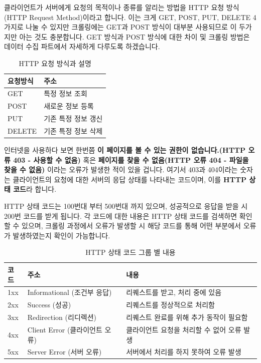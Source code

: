 \documentclass[]{book}
\begin{document}
클라이언트가 서버에게 요청의 목적이나 종류를 알리는 방법을 HTTP 요청 방식(HTTP Request Method)이라고 합니다. 이는 크게 GET, POST, PUT, DELETE 4가지로 나눌 수 있지만 크롤링에는 GET과 POST 방식이 대부분 사용되므로 이 두가지만 아는 것도 충분합니다. GET 방식과 POST 방식에 대한 차이 및 크롤링 방법은 데이터 수집 파트에서 자세하게 다루도록 하겠습니다.

\begin{table}[t]

\caption{\label{tab:unnamed-chunk-6}HTTP 요청 방식과 설명}
\centering
\begin{tabular}{ll}
\toprule
요청방식 & 주소\\
\midrule
GET & 특정 정보 조회\\
POST & 새로운 정보 등록\\
PUT & 기존 특정 정보 갱신\\
DELETE & 기존 특정 정보 삭제\\
\bottomrule
\end{tabular}
\end{table}

인터넷을 사용하다 보면 한번쯤 \textbf{이 페이지를 볼 수 있는 권한이 없습니다.(HTTP 오류 403 - 사용할 수 없음)} 혹은 \textbf{페이지를 찾을 수 없음(HTTP 오류 404 - 파일을 찾을 수 없음)} 이라는 오류가 발생한 적이 있을 겁니다. 여기서 403과 404이라는 숫자는 클라이언트의 요청에 대한 서버의 응답 상태를 나타내는 코드이며, 이를 \textbf{HTTP 상태 코드}라 합니다.

HTTP 상태 코드는 100번대 부터 500번대 까지 있으며, 성공적으로 응답을 받을 시 200번 코드를 받게 됩니다. 각 코드에 대한 내용은 HTTP 상태 코드를 검색하면 확인할 수 있으며, 크롤링 과정에서 오류가 발생할 시 해당 코드를 통해 어떤 부분에서 오류가 발생하였는지 확인이 가능합니다.

\begin{table}[t]

\caption{\label{tab:unnamed-chunk-7}HTTP 상태 코드 그룹 별 내용}
\centering
\begin{tabular}{lll}
\toprule
코드 & 주소 & 내용\\
\midrule
1xx & Informational (조건부 응답) & 리퀘스트를 받고, 처리 중에 있음\\
2xx & Success (성공) & 리퀘스트를 정상적으로 처리함\\
3xx & Redirection (리디렉션) & 리퀘스트 완료를 위해 추가 동작이 필요함\\
4xx & Client Error (클라이언트 오류) & 클라이언트 요청을 처리할 수 없어 오류 발생\\
5xx & Server Error (서버 오류) & 서버에서 처리를 하지 못하여 오류 발생\\
\bottomrule
\end{tabular}
\end{table}
\end{document}
